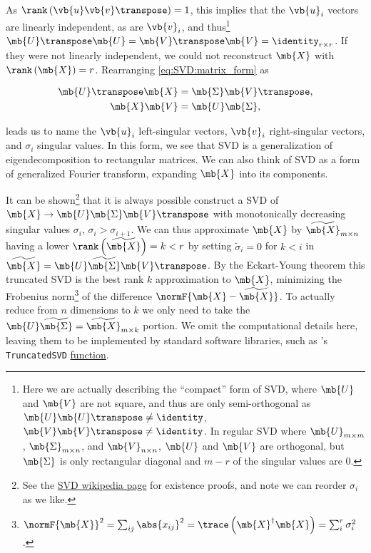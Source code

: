As $\rank\left(\vb{u} \vb{v}\transpose\right) = 1$,
this implies that the $\vb{u}_{i}$ vectors are linearly independent, as are $\vb{v}_{i}$,
and thus\footnote{Here we are actually describing the ``compact'' form of SVD,
where $\mb{U}$ and $\mb{V}$ are not square, and thus are only semi-orthogonal
as $\mb{U} \mb{U}\transpose \neq \identity$, $\mb{V} \mb{V}\transpose \neq \identity$.
In regular SVD where $\mb{U}_{m \times m}$, $\mb{\Sigma}_{m \times n}$, and $\mb{V}_{n \times n}$,
$\mb{U}$ and $\mb{V}$ are orthogonal,
but $\mb{\Sigma}$ is only rectangular diagonal and $m-r$ of the singular values
are 0.} $\mb{U}\transpose \mb{U} = \mb{V}\transpose \mb{V} = \identity_{r \times r}$.
If they were not linearly independent,
we could not reconstruct $\mb{X}$ with $\rank\left(\mb{X}\right) = r$.
Rearranging \cref{eq:SVD:matrix_form} as

\begin{subequations}\label{eq:SVD:left_right}
\begin{align}
\mb{U}\transpose \mb{X} &= \mb{\Sigma} \mb{V}\transpose, \label{eq:SVD:left_right:left} \\
\mb{X} \mb{V} &= \mb{U} \mb{\Sigma}, \label{eq:SVD:left_right:right}
\end{align}
\end{subequations}

\noindent leads us to name the
$\vb{u}_{i}$ left-singular vectors,
$\vb{v}_{i}$ right-singular vectors,
and $\sigma_{i}$ singular values.
In this form, we see that SVD is a generalization of eigendecomposition to rectangular matrices.
We can also think of SVD as a form of generalized Fourier transform, expanding $\mb{X}$ into its components.

It can be shown\footnote{See the \href{https://en.wikipedia.org/wiki/Singular\_value\_decomposition\#Existence\_proofs}{SVD wikipedia page} for
existence proofs, and note we can reorder $\sigma_{i}$ as we like.} that
it is always possible construct a SVD of $\mb{X} \to \mb{U} \mb{\Sigma} \mb{V}\transpose$
with monotonically decreasing singular values $\sigma_{i}$, $\sigma_{i} > \sigma_{i+1}$.
We can thus approximate $\mb{X}$ by $\widetilde{\mb{X}}_{m \times n}$
having a lower $\rank\left(\widetilde{\mb{X}}\right) = k < r$
by setting $\widetilde{\sigma}_{i} = 0$ for $k < i$ in
$\widetilde{\mb{X}} = \mb{U} \widetilde{\mb{\Sigma}} \mb{V}\transpose$.
By the Eckart-Young theorem \cite{eckart1936}
this truncated SVD is the best rank $k$ approximation to $\mb{X}$,
minimizing the Frobenius norm\footnote{$\normF{\mb{X}}^{2} = \sum_{ij} \abs{x_{ij}}^{2} = \trace\left(\mb{X}^{\dagger} \mb{X}\right) = \sum_{i}^{r} \sigma_{i}^{2}$.} of
the difference $\normF{\mb{X} - \widetilde{\mb{X}}}$.
To actually reduce from $n$ dimensions to $k$ we only need to take the
$\mb{U} \widetilde{\mb{\Sigma}} = \widetilde{\mb{X}}_{m \times k}$ portion.
We omit the computational details here, leaving them to be implemented
by standard software libraries, such as {\sklearn}'s \texttt{TruncatedSVD}
\href{https://scikit-learn.org/stable/modules/generated/sklearn.decomposition.TruncatedSVD.html}{function}.

